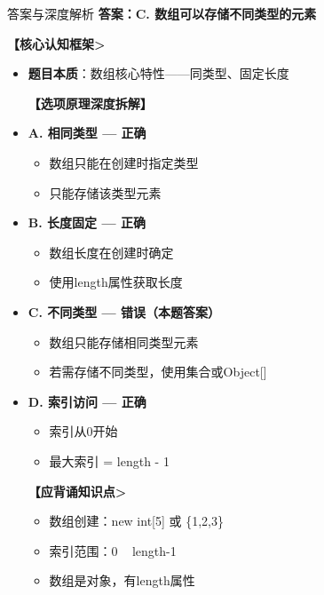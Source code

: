 \documentclass[12pt, a4paper]{ctexart}
\begin{document}
\begin{enumerate}[label=\textbf{\arabic*.}]
	      \begin{bluebox}{答案与深度解析}
		      \textbf{答案：C. 数组可以存储不同类型的元素}

		      \textbf{【核心认知框架>}
		      \begin{itemize}[label={}, leftmargin=*, nosep]
			      \item \textbf{题目本质}：数组核心特性——同类型、固定长度

		      \textbf{【选项原理深度拆解】}

				\item \textbf{A. 相同类型 — 正确}
				\begin{itemize}[label={}, nosep]
					\item 数组只能在创建时指定类型
					\item 只能存储该类型元素
				\end{itemize}

				\item \textbf{B. 长度固定 — 正确}
				\begin{itemize}[label={}, nosep]
					\item 数组长度在创建时确定
					\item 使用length属性获取长度
				\end{itemize}

				\item \textbf{C. 不同类型 — 错误（本题答案）}
				\begin{itemize}[label={}, nosep]
					\item 数组只能存储相同类型元素
					\item 若需存储不同类型，使用集合或Object[]
				\end{itemize}

				\item \textbf{D. 索引访问 — 正确}
				\begin{itemize}[label={}, nosep]
					\item 索引从0开始
					\item 最大索引 = length - 1
				\end{itemize}

				\textbf{【应背诵知识点>}
				\begin{itemize}[label={}, nosep]
					\item 数组创建：new int[5] 或 \{1,2,3\}
					\item 索引范围：0 ~ length-1
					\item 数组是对象，有length属性
				\end{itemize}
		      \end{itemize}


\end{bluebox}
\end{enumerate}
\end{document}
